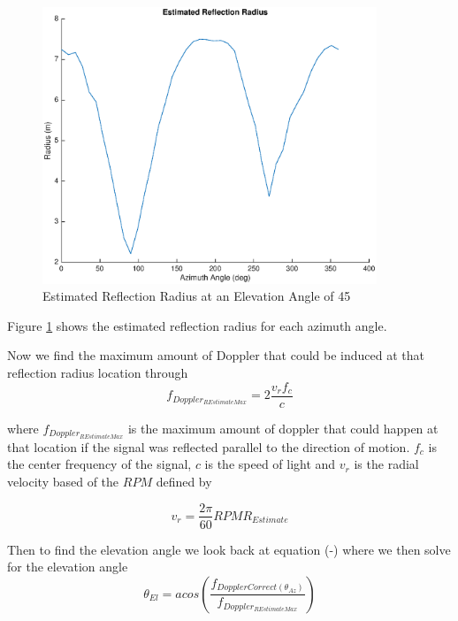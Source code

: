 \begin{figure}
	\begin{center}
		\includegraphics[width=10cm]{images/results/Estimated_reflection_radius_Azimuth_range.eps}
		\caption{Estimated Reflection Radius at an Elevation Angle of 45\textdegree}
		\label{fig:est_radius_azimuth_range}
	\end{center}
\end{figure}

Figure \ref{fig:est_radius_azimuth_range} shows the estimated reflection radius for each azimuth angle.

Now we find the maximum amount of Doppler that could be induced at that reflection radius location through
\begin{equation}
	f_{Doppler_{R Estimate Max}} = 2\frac{v_r f_c}{c}
	\label{eqn:max_doppler}
\end{equation}

where $f_{Doppler_{R Estimate Max}}$ is the maximum amount of doppler that could happen at that location if the signal was reflected parallel to the direction of motion. $f_c$ is the center frequency of the signal, $c$ is the speed of light and $v_r$ is the radial velocity based of the $RPM$ defined by

\begin{equation}
	v_r = \frac{2\pi}{60} RPM R_{Estimate}
	\label{eqn:v_radial}
\end{equation}

Then to find the elevation angle we look back at equation (-) where we then solve for the elevation angle 
\begin{equation}
	\theta_{El} = acos\left(\frac{f_{DopplerCorrect(\theta_{Az})}}{f_{Doppler_{R Estimate Max}}}\right)
	\label{eqn:elevation_angle}
\end{equation}

